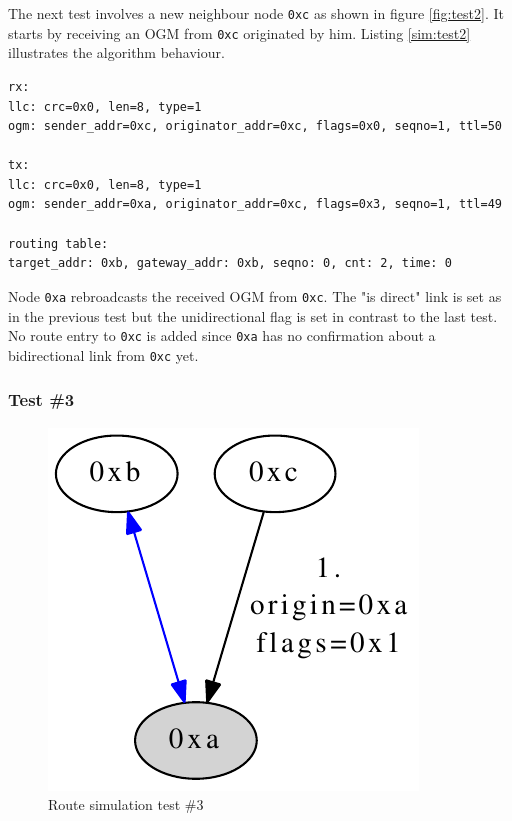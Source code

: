 The next test involves a new neighbour node \texttt{0xc} as shown in figure \ref{fig:test2}. It starts by receiving an OGM from \texttt{0xc} originated by him. Listing \ref{sim:test2} illustrates the algorithm behaviour.

\begin{lstlisting}[label=sim:test2,caption=Output of Test \#2]
rx:
llc: crc=0x0, len=8, type=1
ogm: sender_addr=0xc, originator_addr=0xc, flags=0x0, seqno=1, ttl=50

tx:
llc: crc=0x0, len=8, type=1
ogm: sender_addr=0xa, originator_addr=0xc, flags=0x3, seqno=1, ttl=49

routing table: 
target_addr: 0xb, gateway_addr: 0xb, seqno: 0, cnt: 2, time: 0
\end{lstlisting}

Node \texttt{0xa} rebroadcasts the received OGM from \texttt{0xc}. The "is direct" link is set as in the previous test but the unidirectional flag is set in contrast to the last test. No route entry to \texttt{0xc} is added since \texttt{0xa} has no confirmation about a bidirectional link from \texttt{0xc} yet.

\subsubsection{Test \#3}%
\begin{figure}[H]
  \begin{center}
    \includegraphics[]{figures/test3}
  \end{center}
  \caption{Route simulation test \#3}
\end{figure}

